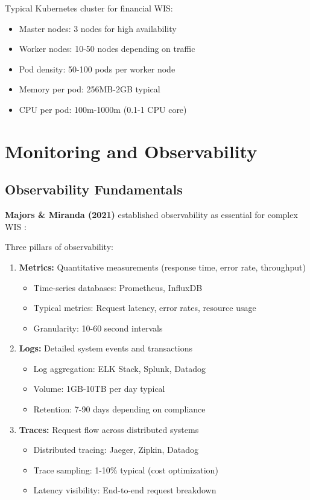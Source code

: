 \documentclass[conference]{IEEEtran}
\begin{document}
\begin{enumerate}
Typical Kubernetes cluster for financial WIS:
\begin{itemize}
    \item Master nodes: 3 nodes for high availability
    \item Worker nodes: 10-50 nodes depending on traffic
    \item Pod density: 50-100 pods per worker node
    \item Memory per pod: 256MB-2GB typical
    \item CPU per pod: 100m-1000m (0.1-1 CPU core)
\end{itemize}

\section{Monitoring and Observability}

\subsection{Observability Fundamentals}

\textbf{Majors \& Miranda (2021)} established observability as essential for complex WIS \cite{majors2021observability}:

Three pillars of observability:

\begin{enumerate}
    \item \textbf{Metrics:} Quantitative measurements (response time, error rate, throughput)
    \begin{itemize}
        \item Time-series databases: Prometheus, InfluxDB
        \item Typical metrics: Request latency, error rates, resource usage
        \item Granularity: 10-60 second intervals
    \end{itemize}
    
    \item \textbf{Logs:} Detailed system events and transactions
    \begin{itemize}
        \item Log aggregation: ELK Stack, Splunk, Datadog
        \item Volume: 1GB-10TB per day typical
        \item Retention: 7-90 days depending on compliance
    \end{itemize}
    
    \item \textbf{Traces:} Request flow across distributed systems
    \begin{itemize}
        \item Distributed tracing: Jaeger, Zipkin, Datadog
        \item Trace sampling: 1-10\% typical (cost optimization)
        \item Latency visibility: End-to-end request breakdown
    \end{itemize}
\end{enumerate}


\end{enumerate}
\end{document}
